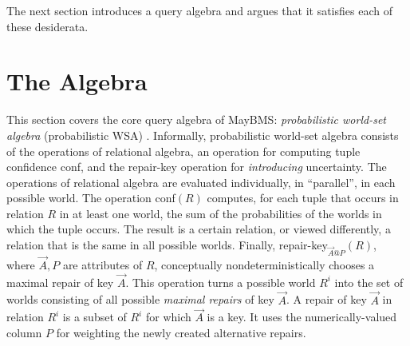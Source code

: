 The next section introduces a query algebra and argues that it satisfies each of these desiderata.









\section{The Algebra}
\label{sect:pwsa}


This section covers the core query algebra of MayBMS: {\em probabilistic world-set algebra}\/ (probabilistic WSA) \cite{AKO07ISQL, Koch2008, Koch2008-SO}.
Informally, probabilistic world-set algebra consists of the operations of relational algebra,
an operation for computing tuple confidence conf, and the repair-key operation for {\em introducing}\/ uncertainty.
%
The operations of relational algebra are evaluated individually, in ``parallel'',
in each possible world.
The operation conf$(R)$
computes, for each tuple that occurs in relation $R$ in at least one world, the
sum of the probabilities of the worlds in which the tuple occurs.
The result is a certain relation, or viewed differently, a relation that is the same in
all possible worlds.
Finally, repair-key$_{\vec{A}@P}(R)$, where $\vec{A}, P$ are attributes of $R$,
conceptually nondeterministically chooses a maximal repair of
key $\vec{A}$.
This operation turns a possible world $R^i$ into the set of worlds consisting of all possible
{\em maximal repairs}\/ of key $\vec{A}$. A repair of key $\vec{A}$ in relation $R^i$ is a subset of $R^i$ for which $\vec{A}$ is a key.
It uses the numerically-valued column $P$ for weighting the newly created alternative
repairs.



